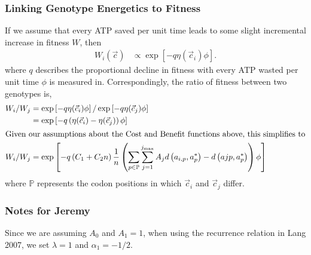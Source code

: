 \documentclass{article}
\newcommand{\setP}{\ensuremath{\mathbb{P}}\xspace}
\newcommand{\jmax}{\ensuremath{{j_{\max}}}\xspace}
\newcommand{\cvec}{\ensuremath{\Vec{c}}\xspace}
\newcommand{\cveci}{\ensuremath{\cvec_i}\xspace}
\newcommand{\cvecj}{\ensuremath{\cvec_j}\xspace}
\newcommand{\aip}{\ensuremath{a_{i,p}}\xspace}
\newcommand{\aopt}{\ensuremath{a^*}\xspace}
\newcommand{\aoptp}{\ensuremath{\aopt_p}\xspace}
\newcommand{\Cost}{\ensuremath{\text{Cost}}\xspace}
\newcommand{\Func}{\ensuremath{\text{Benefit}}\xspace}
\begin{document}
\subsubsection*{Linking Genotype Energetics to Fitness}
If we assume that every ATP saved per unit time leads to some slight incremental increase in fitness $W$, then
\begin{align}
  W_i\left(\cvec\right) &\propto \exp\left[- q \eta(\cveci) \phi\right].
\end{align}
where $q$ describes the proportional decline in fitness with every ATP wasted per unit time $\phi$ is measured in.
Correspondingly, the ratio of fitness between two genotypes is,
\begin{align}
  W_i/W_j &=  \exp\left[- q \eta(\cveci) \phi\right]/\exp\left[- q \eta(\cvecj) \phi\right]\\
  &=  \exp\left[- q \left(\eta(\cveci)- \eta(\cvecj)\right) \phi\right]\\
\intertext{Given our assumptions about the \Cost and \Func functions above, this simplifies to}
  W_i/W_j &=  \exp\left[- q \left(C_1 + C_2 n\right) \frac{1}{n}\left(\sum_{p \in \setP} \sum_{j=1}^\jmax A_j d\left(\aip,\aoptp\right) - d\left(ajp,\aoptp\right)\right) \phi\right]\\
\end{align}
where \setP represents the codon positions in which \cveci and \cvecj differ.


\subsubsection*{Notes for Jeremy}
Since we are assuming $A_0$ and $A_1 = 1$, when using the recurrence relation in Lang 2007, we set $\lambda = 1$ and $\alpha_1 = -1/2$.




\end{document}
